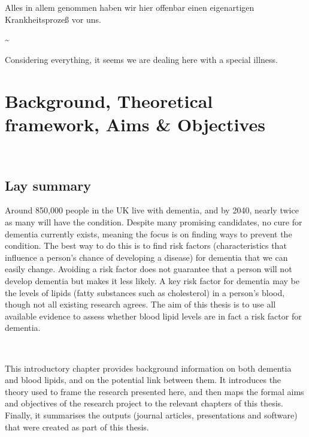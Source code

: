 \documentclass[a4paper, twoside]{templates/ociamthesis}
\begin{document}
\raggedbottom

\begin{savequote}
Alles in allem genommen haben wir hier offenbar einen eigenartigen
Krankheitsprozeß vor uns.

\textasciitilde{}

Considering everything, it seems we are dealing here with a special
illness.
\end{savequote}



\hypertarget{background-heading}{%
\chapter{Background, Theoretical framework, Aims \& Objectives}\label{background-heading}}

~

\minitoc 

\newpage

\begin{laybox}

\hypertarget{lay-summary}{%
\section*{Lay summary}\label{lay-summary}}

Around 850,000 people in the UK live with dementia, and by 2040, nearly twice as many will have the condition. Despite many promising candidates, no cure for dementia currently exists, meaning the focus is on finding ways to prevent the condition. The best way to do this is to find risk factors (characteristics that influence a person's chance of developing a disease) for dementia that we can easily change. Avoiding a risk factor does not guarantee that a person will not develop dementia but makes it less likely. A key risk factor for dementia may be the levels of lipids (fatty substances such as cholesterol) in a person's blood, though not all existing research agrees. The aim of this thesis is to use all available evidence to assess whether blood lipid levels are in fact a risk factor for dementia.

~

This introductory chapter provides background information on both dementia and blood lipids, and on the potential link between them. It introduces the theory used to frame the research presented here, and then maps the formal aims and objectives of the research project to the relevant chapters of this thesis. Finally, it summarises the outputs (journal articles, presentations and software) that were created as part of this thesis.

\end{laybox}
\end{document}

